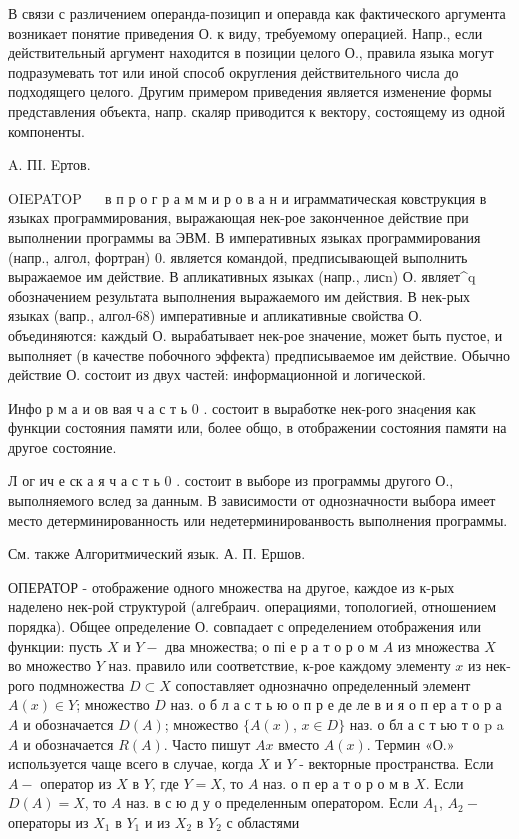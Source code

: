 \documentclass[10pt]{article}
\begin{document}
В связи с различением операнда-позицип и операвда как фактического аргумента возникает понятие приведения О. к виду, требуемому операцией. Напр., если действительный аргумент находится в позиции целого О., правила языка могут подразумевать тот или иной способ округления действительного числа до подходящего целого. Другим примером приведения является изменение формы представления объекта, напр. скаляр приводится к вектору, состоящему из одной компоненты.

A. ПI. Eртов.

OIEPATOP $\quad$ в п р о г р а м м и р о в а н и играмматическая ковструкция в языках программирования, выражающая нек-рое законченное действие при выполнении программы ва ЭВМ. В императивных языках программирования (напр., алгол, фортран) 0. является командой, предписывающей выполнить выражаемое им действие. В апликативных языках (напр., лисn) О. являет\^{}q обозначением результата выполнения выражаемого им действия. В нек-рых языках (вапр., алгол-68) императивные и апликативные свойства О. объединяются: каждый О. вырабатывает нек-рое значение, может быть пустое, и выполняет (в качестве побочного эффекта) предписываемое им действие. Обычно действие $О$. состоит из двух частей: информационной и логической.

Инфо р м а и ов вая ч а с т ь 0 . состоит в выработке нек-рого знаqения как функции состояния памяти или, более общо, в отображении состояния памяти на другое состояние.

Л ог ич е ск а я ч а с т ь 0 . состоит в выборе из программы другого О., выполняемого вслед за данным. В зависимости от однозначности выбора имеет место детерминированность или недетерминированвость выполнения программы.

См. также Алгоритмический язык. А. П. Ершов.

ОПЕРАТОР - отображение одного множества на другое, каждое из к-рых наделено нек-рой структурой (алгебраич. операциями, топологией, отношением порядка). Общее определение О. совпадает с определением отображения или функции: пусть $X$ и $Y-$ два множества; о пі е р а т о р о м $A$ из множества $X$ во множество $Y$ наз. правило или соответствие, к-рое каждому элементу $x$ из нек-рого подмножества $D \subset X$ сопоставляет однозначно определенный элемент $A(x) \in Y$; множество $D$ наз. о б л а с т ь ю о п р е де ле в и я о п ер а т о р а $A$ и обозначается $D(A)$; множество $\{A(x)$, $x \in D\}$ наз. о бл а с т ью т о $\mathrm{p}$ a $A$ и обозначается $R(A)$. Часто пишут $A x$ вместо $A(x)$. Термин «О.» используется чаще всего в случае, когда $X$ и $Y$ - векторные пространства. Если $A-$ оператор из $X$ в $Y$, где $Y=X$, то $A$ наз. о п ер а т о р о м в $X$. Если $D(A)=X$, то $A$ наз. в с ю д у о пределенным оператором. Если $A_{1}$, $A_{2}-$ операторы из $X_{1}$ в $Y_{1}$ и из $X_{2}$ в $Y_{2}$ с областями
\end{document}

